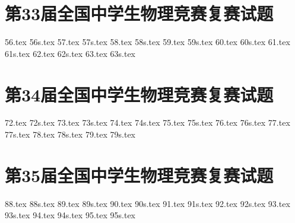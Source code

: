 \section{第33届全国中学生物理竞赛复赛试题}
{56.tex}
{56s.tex}
{57.tex}
{57s.tex}
{58.tex}
{58s.tex}
{59.tex}
{59s.tex}
{60.tex}
{60s.tex}
{61.tex}
{61s.tex}
{62.tex}
{62s.tex}
{63.tex}
{63s.tex}
\section{第34届全国中学生物理竞赛复赛试题}
{72.tex}
{72s.tex}
{73.tex}
{73s.tex}
{74.tex}
{74s.tex}
{75.tex}
{75s.tex}
{76.tex}
{76s.tex}
{77.tex}
{77s.tex}
{78.tex}
{78s.tex}
{79.tex}
{79s.tex}
\section{第35届全国中学生物理竞赛复赛试题}
{88.tex}
{88s.tex}
{89.tex}
{89s.tex}
{90.tex}
{90s.tex}
{91.tex}
{91s.tex}
{92.tex}
{92s.tex}
{93.tex}
{93s.tex}
{94.tex}
{94s.tex}
{95.tex}
{95s.tex}

